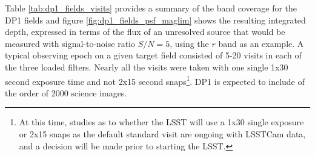 Table \ref{tab:dp1_fields_visits} provides a summary of the band coverage for the DP1 fields and figure \ref{fig:dp1_fields_psf_maglim} shows the
resulting integrated depth, expressed in terms of the flux of an unresolved source that would be measured with signal-to-noise ratio $S/N = 5$, using the $r$ band as an example.
A typical observing epoch on a given target field consisted of 5-20 visits in each of the three loaded filters.
Nearly all the visits  were taken with one single 1x30 second exposure time and not  2x15 second snaps\footnote{At this time, studies as to whether the LSST will use a 1x30 single exposure or 2x15 snaps as the default standard visit are ongoing with LSSTCam data, and a decision will be made prior to starting the LSST. }.
DP1 is expected to include of the order of 2000 science images.


